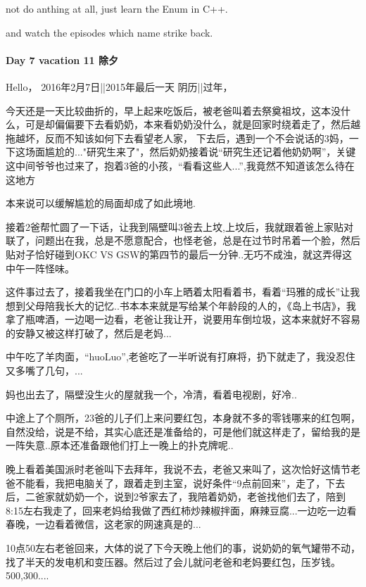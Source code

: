\documentclass[UTF8,a4paper,8pt]{ctexbook}
\begin{document}
	 	 not do anthing at all, just learn the Enum in C++.
	 	 
	 	 and watch the episodes which name strike back.
 	 \paragraph{Day 7   vacation 11    \quad  除夕}
	 	 Hello， 2016年2月7日||2015年最后一天 阴历||过年，
	 	 
	 	 今天还是一天比较曲折的，早上起来吃饭后，被老爸叫着去祭奠祖坟，这本没什么，可是却偏偏要下去看奶奶，本来看奶奶没什么，就是回家时绕着走了，然后越拖越坏，反而不知该如何下去看望老人家， 下去后，遇到一个不会说话的3妈，一下这场面尴尬的..."研究生来了"，然后奶奶接着说“研究生还记着他奶奶啊”，关键这中间爷爷也过来了，抱着3爸的小孩，“看看这些人...”,我竟然不知道该怎么待在这地方
	 	 
	 	 本来说可以缓解尴尬的局面却成了如此境地.
	 	 
	 	 接着2爸帮忙圆了一下话，让我到隔壁叫3爸去上坟,上坟后，我就跟着爸上家贴对联了，问题出在我，总是不愿意配合，也怪老爸，总是在过节时吊着一个脸，然后贴对子恰好碰到OKC VS GSW的第四节的最后一分钟..无巧不成浊，就这弄得这中午一阵怪味。
	 	 
	 	 这件事过去了，接着我坐在门口的小车上晒着太阳看着书，看着“玛雅的成长”让我想到父母陪我长大的记忆..书本本来就是写给某个年龄段的人的，《岛上书店》，我拿了瓶啤酒，一边喝一边看，老爸让我让开，说要用车倒垃圾，这本来就好不容易的安静又被这样打破了，然后是老妈...
	 	 
	 	 中午吃了羊肉面，“huoLuo”,老爸吃了一半听说有打麻将，扔下就走了，我没忍住又多嘴了几句，...
	 	 
	 	 妈也出去了，隔壁没生火的屋就我一个，冷清，看着电视剧，好冷..
	 	 
	 	 中途上了个厕所，23爸的儿子们上来问要红包，本身就不多的零钱哪来的红包啊，自然没给，说是不给，其实心底还是准备给的，可是他们就这样走了，留给我的是一阵失意..原本还准备跟他们打上一晚上的扑克牌呢..
	 	 
	 	 晚上看着美国派时老爸叫下去拜年，我说不去，老爸又来叫了，这次恰好这情节老爸不能看，我把电脑关了，跟着走到主室，说好条件“9点前回来”，走了，下去后，二爸家就奶奶一个，说到2爷家去了，我陪着奶奶，老爸找他们去了，陪到8:15左右我走了，回来老妈给我做了西红柿炒辣椒拌面，麻辣豆腐...一边吃一边看春晚，一边看着微信，这老家的网速真是的...
	 	 
	 	 10点50左右老爸回来，大体的说了下今天晚上他们的事，说奶奶的氧气罐带不动，找了半天的发电机和变压器。然后过了会儿就问老爸和老妈要红包，压岁钱。500,300....
	 	 
\end{document}

